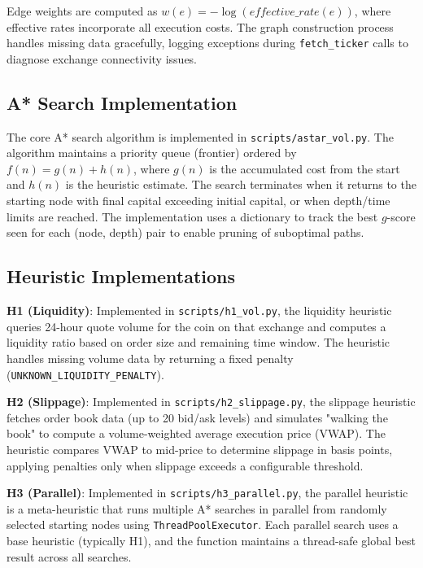 \documentclass[11pt]{article}
\begin{document}
Edge weights are computed as $w(e) = -\log(\textit{effective\_rate}(e))$, where effective rates incorporate all execution costs. The graph construction process handles missing data gracefully, logging exceptions during \texttt{fetch\_ticker} calls to diagnose exchange connectivity issues.

\subsection{A* Search Implementation}

The core A* search algorithm is implemented in \texttt{scripts/astar\_vol.py}. The algorithm maintains a priority queue (frontier) ordered by $f(n) = g(n) + h(n)$, where $g(n)$ is the accumulated cost from the start and $h(n)$ is the heuristic estimate. The search terminates when it returns to the starting node with final capital exceeding initial capital, or when depth/time limits are reached. The implementation uses a dictionary to track the best $g$-score seen for each (node, depth) pair to enable pruning of suboptimal paths.

\subsection{Heuristic Implementations}

\textbf{H1 (Liquidity)}: Implemented in \texttt{scripts/h1\_vol.py}, the liquidity heuristic queries 24-hour quote volume for the coin on that exchange and computes a liquidity ratio based on order size and remaining time window. The heuristic handles missing volume data by returning a fixed penalty (\texttt{UNKNOWN\_LIQUIDITY\_PENALTY}).

\textbf{H2 (Slippage)}: Implemented in \texttt{scripts/h2\_slippage.py}, the slippage heuristic fetches order book data (up to 20 bid/ask levels) and simulates "walking the book" to compute a volume-weighted average execution price (VWAP). The heuristic compares VWAP to mid-price to determine slippage in basis points, applying penalties only when slippage exceeds a configurable threshold.

\textbf{H3 (Parallel)}: Implemented in \texttt{scripts/h3\_parallel.py}, the parallel heuristic is a meta-heuristic that runs multiple A* searches in parallel from randomly selected starting nodes using \texttt{ThreadPoolExecutor}. Each parallel search uses a base heuristic (typically H1), and the function maintains a thread-safe global best result across all searches.
\end{document}
